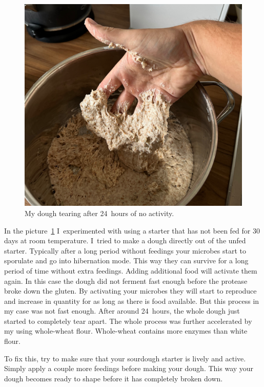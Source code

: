 \begin{figure}[!htb]
  \includegraphics[width=1.0\textwidth]{tearing-dough}
  \caption[Dough tearing]{My dough tearing after 24~hours of no activity.}%
  \label{fig:tearing-dough}
\end{figure}

In the picture~\ref{fig:tearing-dough} I~experimented with
using a starter that has not been fed for 30 days at room temperature.
I~tried to make a dough directly out of the unfed starter.
Typically after a long period
without feedings your microbes start to sporulate and go
into hibernation mode. This way they can survive for a long
period of time without extra feedings. Adding additional food
will activate them again. In this case the dough did not ferment
fast enough before the protease broke down the gluten. By activating
your microbes they will start to reproduce and increase in quantity
for as long as there is food available. But this process
in my case was not fast enough. After around 24~hours, the whole
dough just started to completely tear apart. The whole process was further
accelerated by my using whole-wheat flour. Whole-wheat
contains more enzymes than white flour.

To fix this, try to make sure that your sourdough starter is lively
and active. Simply apply a couple more feedings before
making your dough. This way your dough becomes ready to shape
before it has completely broken down.

